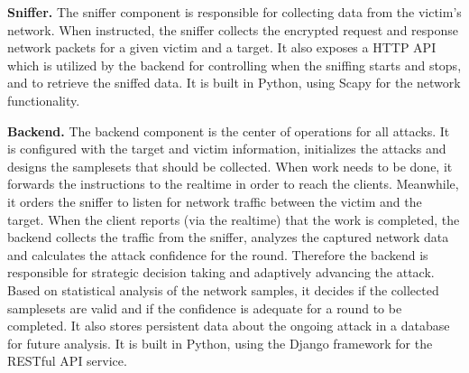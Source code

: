 \noindent \textbf{Sniffer.}
The sniffer component is responsible for collecting data from the victim's
network. When instructed, the sniffer collects the encrypted request and
response network packets for a given victim and a target. It also exposes a HTTP
API which is utilized by the backend for controlling when the sniffing starts and
stops, and to retrieve the sniffed data. It is built in Python, using Scapy
\cite{biondi2010scapy} for the network functionality.

\noindent \textbf{Backend.}
The backend component is the center of operations for all attacks. It is
configured with the target and victim information, initializes the attacks and
designs the samplesets that should be collected.  When work needs to be done,
it forwards the instructions to the realtime in order to reach the clients. Meanwhile, it
orders the sniffer to listen for network traffic between the victim and the
target. When the client reports (via the realtime) that the work is completed, the
backend collects the traffic from the sniffer, analyzes the captured network
data and calculates the attack confidence for the round.
Therefore the backend is responsible for strategic decision taking and
adaptively advancing the attack. Based on statistical analysis of the network
samples, it decides if the collected samplesets are valid and if the confidence
is adequate for a round to be completed. It also stores persistent data about
the ongoing attack in a database for future analysis. It is built in Python,
using the Django framework for the RESTful API service.
